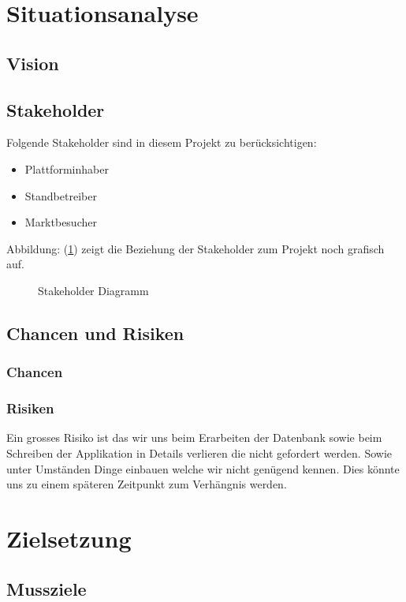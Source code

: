 \section{Situationsanalyse}
\subsection{Vision}
\subsection{Stakeholder}
Folgende Stakeholder sind in diesem Projekt zu berücksichtigen:
\begin{itemize}
   \item Plattforminhaber
   \item Standbetreiber
   \item Marktbesucher
\end{itemize}

Abbildung: (\ref{fig:stakeholder}) zeigt die Beziehung der Stakeholder
zum Projekt noch grafisch auf.

\begin{figure}
  \centering
  \caption{Stakeholder Diagramm\label{fig:stakeholder}}
\end{figure}

\subsection{Chancen und Risiken}

\subsubsection{Chancen}
\subsubsection{Risiken}
Ein grosses Risiko ist das wir uns beim Erarbeiten der Datenbank sowie
beim Schreiben der Applikation in Details verlieren die nicht
gefordert werden. Sowie unter Umständen Dinge einbauen welche wir nicht
genügend kennen. Dies könnte uns zu einem späteren Zeitpunkt zum Verhängnis
werden.

\newpage
\section{Zielsetzung}
\subsection{Mussziele}
